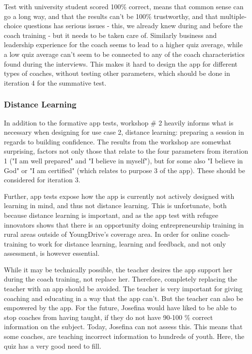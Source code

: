 Test with university student scored 100\% correct, means that common sense can go a long way, and that the results can't be 100\% trustworthy, and that multiple-choice questions has serious issues - this, we already knew during and before the coach training - but it needs to be taken care of. Similarly business and leadership experience for the coach seems to lead to a higher quiz average, while a low quiz average can't seem to be connected to any of the coach characteristics found during the interviews. This makes it hard to design the app for different types of coaches, without testing other parameters, which should be done in iteration 4 for the summative test.

\subsubsection{Distance Learning}
In addition to the formative app tests, workshop \# 2 heavily informs what is necessary when designing for use case 2, distance learning: preparing a session in regards to building confidence. The results from the workshop are somewhat surprising, factors not only those that relate to the four parameters from iteration 1 ("I am well prepared" and "I believe in myself"), but for some also "I believe in God" or "I am certified" (which relates to purpose 3 of the app). These should be considered for iteration 3.

Further, app tests expose how the app is currently not actively designed with learning in mind, and thus not distance learning. This is unfortunate, both because distance learning is important, and as the app test with refugee innovators shows that there is an opportunity doing entrepreneurship training in rural areas outside of YoungDrive's coverage area. In order for online coach-training to work for distance learning, learning and feedback, and not only assessment, is however essential.

While it may be technically possible, the teacher desires the app support her during the coach training, not replace her. Therefore, completely replacing the teacher with an app should be avoided. The teacher is very important for giving coaching and educating in a way that the app can't. But the teacher can also be empowered by the app. For the future, Josefina would have liked to be able to stop coaches from having taught, if they do not have 90-100 \% correct information on the subject. Today, Josefina can not assess this. This means that some coaches, are teaching incorrect information to hundreds of youth. Here, the quiz has a very good need to fill.

